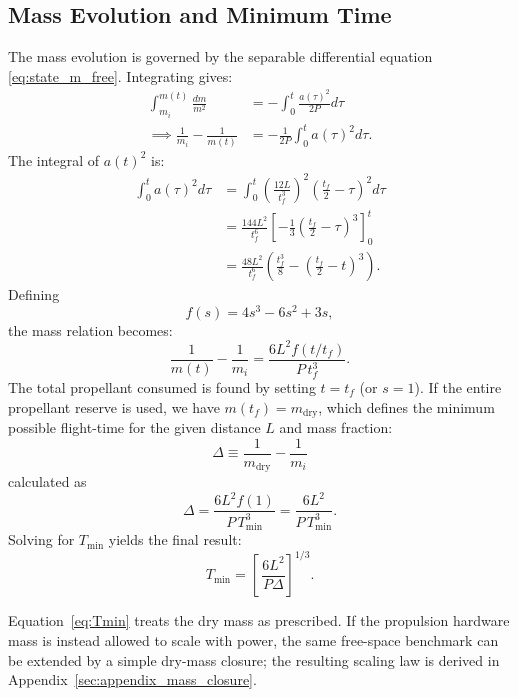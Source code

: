 \documentclass[journal, a4paper]{IEEEtran}
\begin{document}
\subsection{Mass Evolution and Minimum Time}
The mass evolution is governed by the separable differential equation \eqref{eq:state_m_free}. Integrating gives:
\begin{align}
    \int_{m_i}^{m(t)} \frac{dm}{m^2} &= -\int_0^t \frac{a(\tau)^2}{2P} d\tau \nonumber\\ 
    \implies \frac{1}{m_i} - \frac{1}{m(t)} &= -\frac{1}{2P} \int_0^t a(\tau)^2 d\tau.
\end{align}
The integral of $a(t)^2$ is:
\begin{align}
    \int_0^t a(\tau)^2 d\tau &= \int_0^t \left(\frac{12L}{t_f^3}\right)^2 \left(\frac{t_f}{2}-\tau\right)^2 d\tau \nonumber\\
    &= \frac{144L^2}{t_f^6} \left[-\frac{1}{3}\left(\frac{t_f}{2}-\tau\right)^3\right]_0^t \nonumber\\
    &= \frac{48L^2}{t_f^6} \left(\frac{t_f^3}{8} - \left(\frac{t_f}{2}-t\right)^3 \right).
\end{align}
Defining 
\begin{equation}
f(s)=4s^{3}- 6s^{2}+3s,\label{eq:fdef}
\end{equation}
the mass relation becomes:
\begin{equation}
  \frac{1}{m(t)}-\frac{1}{m_i}
      =\frac{6L^{2}f(t/t_f)}{P\,t_f^{3}}.
  \label{eq:m_free}
\end{equation}
The total propellant consumed is found by setting $t=t_f$ (or $s=1$). If the entire propellant reserve is used, we have $m(t_f)=m_\mathrm{dry}$, which defines the minimum possible flight-time for the given distance $L$ and mass fraction:
\begin{equation}
  \Delta\equiv\frac{1}{m_\mathrm{dry}}-\frac{1}{m_i}
\end{equation} 
calculated as
\begin{equation}
  \Delta = \frac{6L^{2}f(1)}{P\,T_{\min}^{3}} = \frac{6L^2}{P\,T_{\min}^3}.
\end{equation}
Solving for $T_{\min}$ yields the final result:
\begin{equation}
  T_{\min}= \left[\,
       \frac{6L^{2}}
             {P\Delta}
       \right]^{1/3}.
  \label{eq:Tmin}
\end{equation}

Equation~\eqref{eq:Tmin} treats the dry mass as prescribed. If the propulsion hardware mass is instead allowed to scale with power, the same free-space benchmark can be extended by a simple dry-mass closure; the resulting scaling law is derived in Appendix~\ref{sec:appendix_mass_closure}.
\end{document}
